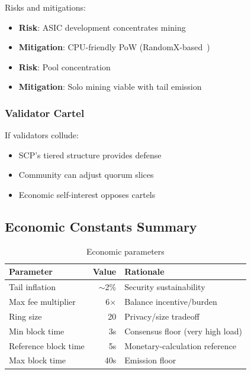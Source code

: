 Risks and mitigations:
\begin{itemize}
  \item \textbf{Risk}: ASIC development concentrates mining
  \item \textbf{Mitigation}: CPU-friendly PoW (RandomX-based~\cite{randomx})
  \item \textbf{Risk}: Pool concentration
  \item \textbf{Mitigation}: Solo mining viable with tail emission
\end{itemize}

\subsubsection{Validator Cartel}

If validators collude:
\begin{itemize}
  \item SCP's tiered structure provides defense
  \item Community can adjust quorum slices
  \item Economic self-interest opposes cartels
\end{itemize}

\subsection{Economic Constants Summary}

\begin{table}[h]
\centering
\caption{Economic parameters}
\label{tab:econ-params}
\begin{tabular}{@{}lrl@{}}
\toprule
\textbf{Parameter} & \textbf{Value} & \textbf{Rationale} \\
\midrule
Tail inflation & $\sim$2\% & Security sustainability \\
Max fee multiplier & 6$\times$ & Balance incentive/burden \\
Ring size & 20 & Privacy/size tradeoff \\
Min block time & 3s & Consensus floor (very high load) \\
Reference block time & 5s & Monetary-calculation reference \\
Max block time & 40s & Emission floor \\
\bottomrule
\end{tabular}
\end{table}

